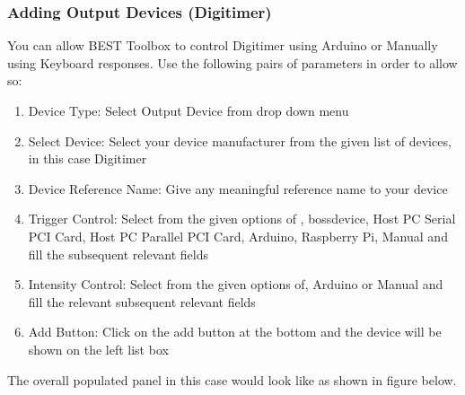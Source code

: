 \documentclass[letterpaper,10pt,english]{sphinxmanual}
\begin{document}
\subsubsection{Adding Output Devices (Digitimer)}
\label{\detokenize{5_HardwareConfiguration:adding-output-devices-digitimer}}
\sphinxAtStartPar
You can allow BEST Toolbox to control Digitimer using Arduino or Manually using Keyboard responses. Use the following pairs of parameters in order to allow so:
\begin{enumerate}
%
\item {} 
\sphinxAtStartPar
Device Type: Select Output Device from drop down menu

\item {} 
\sphinxAtStartPar
Select Device: Select your device manufacturer from the given list of devices, in this case Digitimer

\item {} 
\sphinxAtStartPar
Device Reference Name: Give any meaningful reference name to your device

\item {} 
\sphinxAtStartPar
Trigger Control: Select from the given options of , bossdevice, Host PC Serial PCI Card, Host PC Parallel PCI Card, Arduino, Raspberry Pi, Manual and fill the subsequent relevant fields

\item {} 
\sphinxAtStartPar
Intensity Control: Select from the given options of, Arduino or Manual and fill the relevant subsequent relevant fields

\item {} 
\sphinxAtStartPar
Add Button: Click on the add button at the bottom and the device will be shown on the left list box

\end{enumerate}

\sphinxAtStartPar
The overall populated panel in this case would look like as shown in figure below.

\begin{figure}[htbp]
\centering

\noindent{}
\end{figure}
\end{document}
